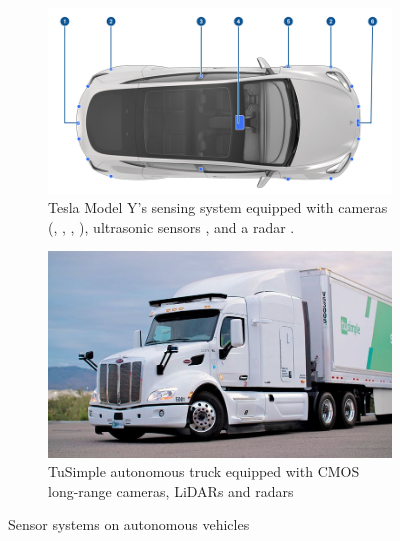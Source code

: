 \begin{figure}[ht]
    \begin{subfigure}[b]{0.49\textwidth} 
        \includegraphics[width=\textwidth]{figures/tesla.png} 
        \caption{
        Tesla Model Y's sensing system
        equipped with cameras (, 
        , 
        , ),
        ultrasonic sensors , and a radar .
        }
        \label{fig:intro-tesla} 
    \end{subfigure} \hfill
    \begin{subfigure}[b]{0.4\textwidth} 
        \includegraphics[width=\textwidth]{figures/tusimple.jpg} 
        \caption{TuSimple autonomous truck equipped with CMOS long-range cameras, 
        LiDARs and radars} 
        \label{fig:intro-truckcam} 
    \end{subfigure} 
    \caption{Sensor systems on autonomous vehicles}
    \label{fig:intro-autonomous-vehicles}
\end{figure} 

